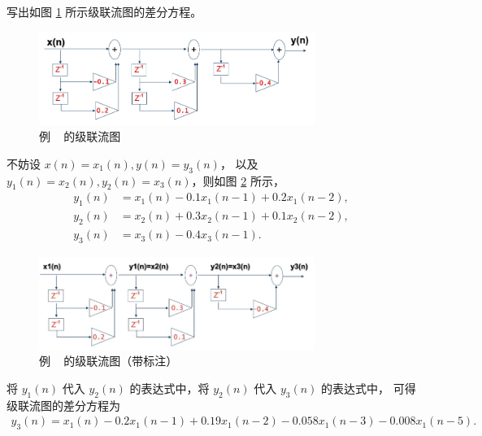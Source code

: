 \begin{example}
    \label{exercise:serial-flow-chart}
    写出如图 \ref{fig:serial-flow-chart} 所示级联流图的差分方程。
    \begin{figure}[H]
        \centering
        \includegraphics[width=0.8\textwidth]{chap4/img/serial_flow_chart.png}
        \caption{例 \theexample~ 的级联流图}
        \label{fig:serial-flow-chart}
    \end{figure}
\end{example}

\begin{solution}
    不妨设 $x(n) = x_1(n), y(n) = y_3(n)$，
    以及 $y_1(n) = x_2(n), y_2(n) = x_3(n)$，则如图 \ref{fig:serial-flow-chart-annotated} 所示，
    \begin{align*}
        y_1(n) & = x_1(n) - 0.1x_1(n - 1) + 0.2x_1(n - 2), \\
        y_2(n) & = x_2(n) + 0.3x_2(n - 1) + 0.1x_2(n - 2), \\
        y_3(n) & = x_3(n) - 0.4x_3(n - 1).
    \end{align*}
    \begin{figure}[H]
        \centering
        \includegraphics[width=0.8\textwidth]{chap4/img/serial_flow_chart_annotated.png}
        \caption{例 \theexample~ 的级联流图（带标注）}
        \label{fig:serial-flow-chart-annotated}
    \end{figure}
    将 $y_1(n)$ 代入 $y_2(n)$ 的表达式中，将 $y_2(n)$ 代入 $y_3(n)$ 的表达式中，
    可得级联流图的差分方程为
    \begin{align*}
        y_3(n) = x_1(n) - 0.2x_1(n - 1) + 0.19x_1(n - 2) - 0.058x_1(n - 3) - 0.008x_1(n - 5).
    \end{align*}
\end{solution}

